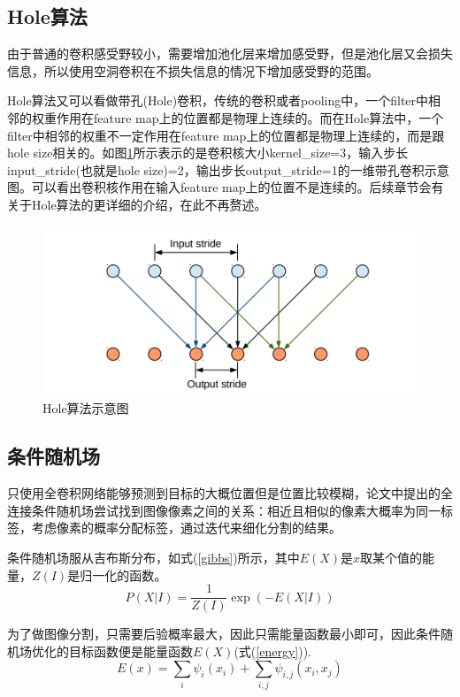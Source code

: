 \documentclass[cn]{elegantbook}
\begin{document}
\subsection{Hole算法}
由于普通的卷积感受野较小，需要增加池化层来增加感受野，但是池化层又会损失信息，所以使用空洞卷积在不损失信息的情况下增加感受野的范围。

Hole算法又可以看做带孔(Hole)卷积，传统的卷积或者pooling中，一个filter中相邻的权重作用在feature map上的位置都是物理上连续的。而在Hole算法中，一个filter中相邻的权重不一定作用在feature map上的位置都是物理上连续的，而是跟hole size相关的。如图\ref{hole}所示表示的是卷积核大小kernel\_size=3，输入步长input\_stride(也就是hole size)=2，输出步长output\_stride=1的一维带孔卷积示意图。可以看出卷积核作用在输入feature map上的位置不是连续的。后续章节会有关于Hole算法的更详细的介绍，在此不再赘述。


\begin{figure}[!h]
	\centering
	\includegraphics[width=\textwidth]{images/hole}
	\caption{\label{hole}Hole算法示意图}
\end{figure}

\subsection{条件随机场}
只使用全卷积网络能够预测到目标的大概位置但是位置比较模糊，论文\cite{krahenbuhl2011efficient}中提出的全连接条件随机场尝试找到图像像素之间的关系：相近且相似的像素大概率为同一标签，考虑像素的概率分配标签，通过迭代来细化分割的结果。

条件随机场服从吉布斯分布，如式(\ref{gibbs})所示，其中$E(X)$是$x$取某个值的能量，$Z(I)$是归一化的函数。
\begin{equation}
\label{gibbs}
P(X|I)=\frac{1}{Z(I)}\exp(-E(X|I))
\end{equation}

为了做图像分割，只需要后验概率最大，因此只需能量函数最小即可，因此条件随机场优化的目标函数便是能量函数$E(X)$(式(\ref{energy})).
\begin{equation}
\label{energy}
E(x)=\sum_i \psi_i(x_i)+\sum_{i,j} \psi_{i,j}(x_i,x_j)
\end{equation}
\end{document}
